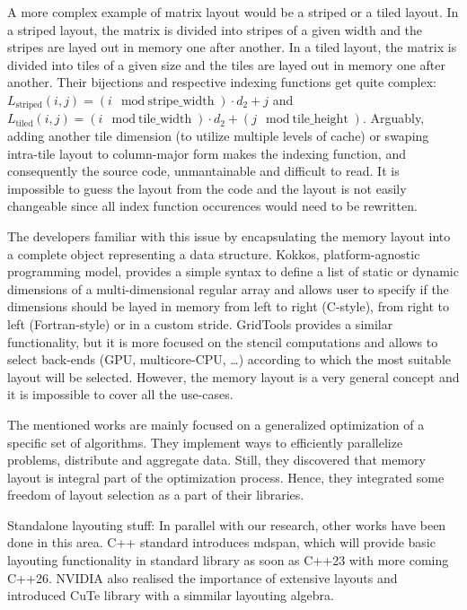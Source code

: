 A more complex example of matrix layout would be a striped or a tiled layout. In a striped layout, the matrix is divided into stripes of a given width and the stripes are layed out in memory one after another. In a tiled layout, the matrix is divided into tiles of a given size and the tiles are layed out in memory one after another. Their bijections and respective indexing functions get quite complex: $L_{\text{striped}}(i,j) = (i \mod \text{stripe\_width}) \cdot d_2 + j$ and $L_{\text{tiled}}(i,j) = (i \mod \text{tile\_width}) \cdot d_2 + (j \mod \text{tile\_height})$. Arguably, adding another tile dimension (to utilize multiple levels of cache) or swaping intra-tile layout to column-major form makes the indexing function, and consequently the source code, unmantainable and difficult to read. It is impossible to guess the layout from the code and the layout is not easily changeable since all index function occurences would need to be rewritten.

The developers familiar with this issue by encapsulating the memory layout into a complete object representing a data structure. Kokkos, platform-agnostic programming model, provides a simple syntax to define a list of static or dynamic dimensions of a multi-dimensional regular array and allows user to specify if the dimensions should be layed in memory from left to right (C-style), from right to left (Fortran-style) or in a custom stride.
GridTools provides a similar functionality, but it is more focused on the stencil computations and allows to select back-ends (GPU, multicore-CPU, \dots) according to which the most suitable layout will be selected. However, the memory layout is a very general concept and it is impossible to cover all the use-cases.

The mentioned works are mainly focused on a generalized optimization of a specific set of algorithms. They implement ways to efficiently parallelize problems, distribute and aggregate data. Still, they discovered that memory layout is integral part of the optimization process. Hence, they integrated some freedom of layout selection as a part of their libraries.

Standalone layouting stuff:
In parallel with our research, other works have been done in this area. C++ standard introduces mdspan, which will provide basic layouting functionality in standard library as soon as C++23 with more coming C++26. NVIDIA also realised the importance of extensive layouts and introduced CuTe library with a simmilar layouting algebra.

